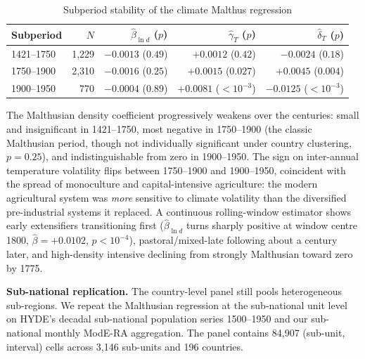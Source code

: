 \documentclass[11pt,letterpaper]{article}
\begin{document}
\begin{table}[H]
\centering
\caption{Subperiod stability of the climate Malthus regression}
\label{tab:malthus-subperiod}
\small
\begin{tabular}{lrrrr}
\toprule
Subperiod & $N$ & $\hat{\beta}_{\ln d}$ ($p$) & $\hat{\gamma}_T$ ($p$) & $\hat{\delta}_T$ ($p$) \\
\midrule
1421--1750 & 1{,}229 & $-0.0013$ ($0.49$)  & $+0.0012$ ($0.42$)        & $-0.0024$ ($0.18$) \\
1750--1900 & 2{,}310 & $-0.0016$ ($0.25$)  & $+0.0015$ ($0.027$)       & $+0.0045$ ($0.004$) \\
1900--1950 &   770   & $-0.0004$ ($0.89$)  & $+0.0081$ ($<10^{-3}$)    & $-0.0125$ ($<10^{-3}$) \\
\bottomrule
\end{tabular}
\end{table}

The Malthusian density coefficient progressively weakens over the centuries: small and insignificant in 1421--1750, most negative in 1750--1900 (the classic Malthusian period, though not individually significant under country clustering, $p=0.25$), and indistinguishable from zero in 1900--1950. The sign on inter-annual temperature volatility flips between 1750--1900 and 1900--1950, coincident with the spread of monoculture and capital-intensive agriculture: the modern agricultural system was \emph{more} sensitive to climate volatility than the diversified pre-industrial systems it replaced. A continuous rolling-window estimator shows early extensifiers transitioning first ($\hat\beta_{\ln d}$ turns sharply positive at window centre 1800, $\hat\beta = +0.0102$, $p<10^{-4}$), pastoral/mixed-late following about a century later, and high-density intensive declining from strongly Malthusian toward zero by 1775.

\textbf{Sub-national replication.} The country-level panel still pools heterogeneous sub-regions. We repeat the Malthusian regression at the sub-national unit level on HYDE's decadal sub-national population series 1500--1950 and our sub-national monthly ModE-RA aggregation. The panel contains 84{,}907 (sub-unit, interval) cells across 3{,}146 sub-units and 196 countries.
\end{document}
